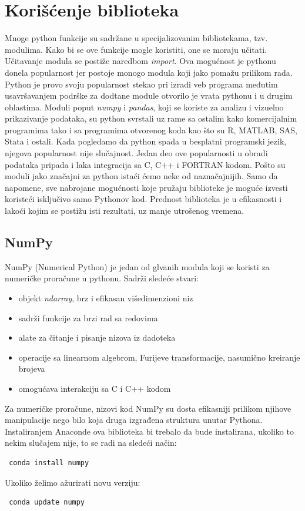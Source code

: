 \documentclass[12pt]{article}
\begin{document}
 \section{Korišćenje biblioteka}
Mnoge python funkcije su sadržane u specijalizovanim bibliotekama, tzv. modulima. Kako bi se ove funkcije mogle koristiti, one se moraju učitati. Učitavanje modula se postiže naredbom \textsl{import}. Ova mogućnost je pythonu donela popularnost jer postoje monogo modula koji jako pomažu prilikom rada. Python je provo svoju popularnost stekao pri izradi veb programa međutim usavršavanjem podrške za dodtane module otvorilo je vrata pythonu i u drugim oblastima. Moduli poput \textsl{numpy} i \textsl{pandas}, koji se koriste za analizu i vizuelno prikazivanje podataka, su python svrstali uz rame sa ostalim kako komercijalnim programima tako i sa programima otvorenog koda kao što su R, MATLAB, SAS, Stata i ostali. Kada pogledamo da python spada u besplatni programski jezik, njegova popularnost nije slučajnost. Jedan deo ove popularnosti u obradi podataka pripada i laka integracija sa C, C++ i FORTRAN kodom.  
Pošto su moduli jako značajni za python istaći ćemo neke od naznačajnijih. Samo da napomene, sve nabrojane mogućnosti koje pružaju biblioteke je moguće izvesti koristeći isključivo samo Pythonov kod. Prednost biblioteka je u efikasnosti i lakoći kojim se postižu isti rezultati, uz manje utrošenog vremena.  
\subsection{NumPy}
NumPy (Numerical Python) je jedan od glvanih modula koji se koristi za numeričke proračune u pythonu. Sadrži sledeće stvari:
\begin{itemize}
\item objekt \textsl{ndarray}, brz i efikasan višedimenzioni niz
\item sadrži funkcije za brzi rad sa redovima
\item alate za čitanje i pisanje nizova iz dadoteka
\item operacije sa linearnom algebrom, Furijeve transformacije, nasumično kreiranje brojeva
\item omogućava interakciju sa C i C++ kodom 
\end{itemize}
Za numeričke proračune, nizovi kod NumPy su dosta efikasniji prilikom njihove manipulacije nego bilo koja druga izgrađena struktura unutar Pythona. Instaliranjem Anaconde ova biblioteka bi trebalo da bude instalirana, ukoliko to nekim slučajem nije, to se radi na sledeći način:
\begin{lstlisting}
 conda install numpy
\end{lstlisting}
Ukoliko želimo ažurirati novu verziju:
\begin{lstlisting}
 conda update numpy
\end{lstlisting}
\end{document}
